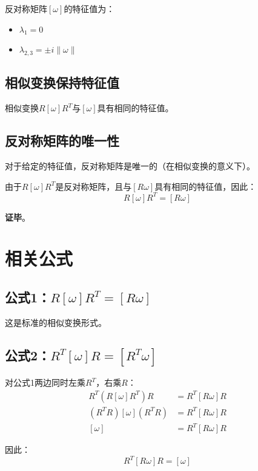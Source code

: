 \documentclass[12pt,a4paper]{article}
\begin{document}
反对称矩阵$[\omega]$的特征值为：
\begin{itemize}
\item $\lambda_1 = 0$
\item $\lambda_{2,3} = \pm i \|\omega\|$
\end{itemize}

\subsection{相似变换保持特征值}

相似变换$R [\omega] R^T$与$[\omega]$具有相同的特征值。

\subsection{反对称矩阵的唯一性}

对于给定的特征值，反对称矩阵是唯一的（在相似变换的意义下）。

由于$R [\omega] R^T$是反对称矩阵，且与$[R \omega]$具有相同的特征值，因此：
\begin{equation}
R [\omega] R^T = [R \omega]
\end{equation}

\textbf{证毕}。

\section{相关公式}

\subsection{公式1：$R [\omega] R^T = [R \omega]$}

这是标准的相似变换形式。

\subsection{公式2：$R^T [\omega] R = [R^T \omega]$}

对公式1两边同时左乘$R^T$，右乘$R$：
\begin{align}
R^T (R [\omega] R^T) R &= R^T [R \omega] R \\
(R^T R) [\omega] (R^T R) &= R^T [R \omega] R \\
[\omega] &= R^T [R \omega] R
\end{align}

因此：
\begin{equation}
R^T [R \omega] R = [\omega]
\end{equation}
\end{document}
